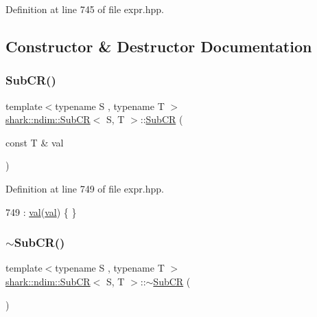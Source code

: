 Definition at line 745 of file expr.\+hpp.



\subsection{Constructor \& Destructor Documentation}
\hypertarget{classshark_1_1ndim_1_1_sub_c_r_a0fe42a1a8f9f2e0c8f8d6d86a6f359c9}{}\label{classshark_1_1ndim_1_1_sub_c_r_a0fe42a1a8f9f2e0c8f8d6d86a6f359c9} 
\subsubsection{\texorpdfstring{Sub\+C\+R()}{SubCR()}}
{\footnotesize\ttfamily template$<$typename S , typename T $>$ \\
\hyperlink{classshark_1_1ndim_1_1_sub_c_r}{shark\+::ndim\+::\+Sub\+CR}$<$ S, T $>$\+::\hyperlink{classshark_1_1ndim_1_1_sub_c_r}{Sub\+CR} (\begin{DoxyParamCaption}\item[{const T \&}]{val }\end{DoxyParamCaption})\hspace{0.3cm}{\ttfamily [inline]}}



Definition at line 749 of file expr.\+hpp.


\begin{DoxyCode}
749 : \hyperlink{classshark_1_1ndim_1_1_sub_c_r_a4fe6be3ba612e66b26384ef24f389852}{val}(\hyperlink{classshark_1_1ndim_1_1_sub_c_r_a4fe6be3ba612e66b26384ef24f389852}{val}) \{ \}
\end{DoxyCode}
\hypertarget{classshark_1_1ndim_1_1_sub_c_r_a1252e990eb39e00dd074c13a178020af}{}\label{classshark_1_1ndim_1_1_sub_c_r_a1252e990eb39e00dd074c13a178020af} 
\subsubsection{\texorpdfstring{$\sim$\+Sub\+C\+R()}{~SubCR()}}
{\footnotesize\ttfamily template$<$typename S , typename T $>$ \\
\hyperlink{classshark_1_1ndim_1_1_sub_c_r}{shark\+::ndim\+::\+Sub\+CR}$<$ S, T $>$\+::$\sim$\hyperlink{classshark_1_1ndim_1_1_sub_c_r}{Sub\+CR} (\begin{DoxyParamCaption}{ }\end{DoxyParamCaption})\hspace{0.3cm}{\ttfamily [inline]}}




